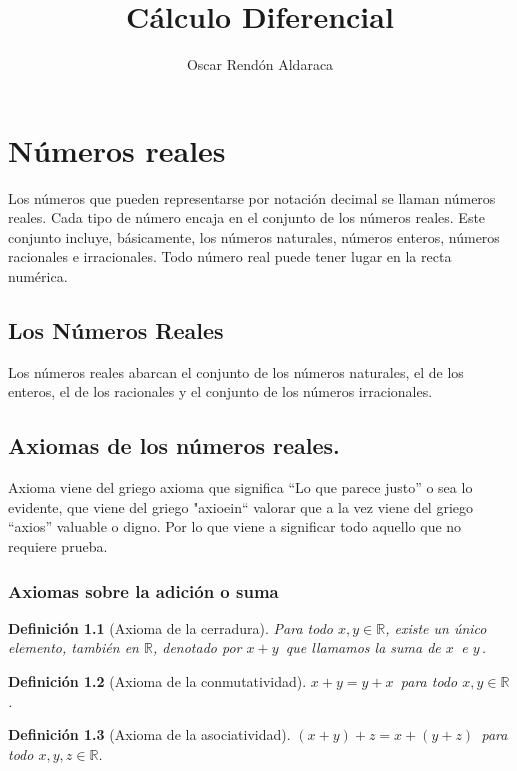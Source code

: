 \documentclass[oneside,spanish,letterpaper]{extbook}
\theoremstyle{mythmstyle}
\newtheorem{definicion}{Definición}[section]
\begin{document}
\title{Cálculo Diferencial}

\author{Oscar Rendón Aldaraca}

\maketitle

\tableofcontents
\chapter{Números reales}
Los números que pueden representarse por notación decimal se llaman números reales.
Cada tipo de número encaja en el conjunto de los números reales.
Este conjunto incluye, básicamente, los números naturales, números enteros, números racionales e irracionales.
Todo número real puede tener lugar en la recta numérica. \cite{cd1}


\section{Los Números Reales}
Los números reales abarcan el conjunto de los números naturales, el de los enteros, el de los racionales y
el conjunto de los números irracionales.
\section{Axiomas de los números reales.}
Axioma viene del griego axioma que significa ``Lo que parece justo'' o sea lo evidente, que viene del
griego "axioein``
 valorar que a la vez viene del griego ``axios'' valuable o digno. 
 Por lo que viene a significar todo aquello que no requiere prueba. 


\subsection{Axiomas sobre la adición o suma}
\begin{definicion}[Axioma de la cerradura]
Para todo $x,y\in \mathbb{R}$, existe un único elemento, también en $\mathbb{R}$, denotado por $\mathit{x}+\mathit{y}\,\!$ que llamamos la suma de $\mathit{x}\,\!$ e $\mathit{y}\,\!$.
\end{definicion}
\begin{definicion}[Axioma de la conmutatividad]
$\mathit{x}+\mathit{y}=\mathit{y}+\mathit{x} \,\!$ para todo $x,y \in \mathbb{R}$.
\end{definicion}

\begin{definicion}[Axioma de la asociatividad]
$(\mathit{x}+\mathit{y})+\mathit{z} = \mathit{x}+(\mathit{y}+\mathit{z})\,\!$ para todo $x,y,z\in \mathbb{R}$.
\end{definicion}
\end{document}

